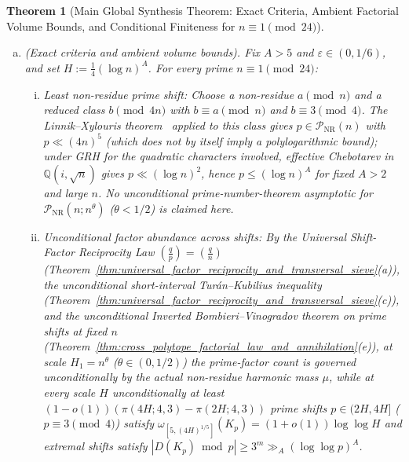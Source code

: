 \documentclass[11pt, a4paper]{article}
\theoremstyle{plain}
\newtheorem{theorem}{Theorem}[section]
\theoremstyle{definition}
\newcommand{\Q}{\mathbb{Q}}
\newcommand{\leg}[2]{\left(\frac{#1}{#2}\right)}
\begin{document}
\begin{theorem}[Main Global Synthesis Theorem: Exact Criteria, Ambient Factorial Volume Bounds, and Conditional Finiteness for $n\equiv1\pmod{24}$]
\begin{enumerate}[(a)]
    \item \emph{(Exact criteria and ambient volume bounds).} Fix $A>5$ and $\varepsilon\in(0,1/6)$, and set $H:=\frac14(\log n)^{A}$. For every prime $n\equiv1\pmod{24}$:
    \begin{enumerate}[(i)]
        \item \emph{Least non-residue prime shift:} Choose a non-residue $a\pmod n$ and a reduced class $b\pmod{4n}$ with $b\equiv a\pmod n$ and $b\equiv3\pmod 4$. The Linnik--Xylouris theorem~\cite{xylouris2011} applied to this class gives $p\in\mathcal{P}_{\mathrm{NR}}(n)$ with $p\ll(4n)^{5}$ (which does not by itself imply a polylogarithmic bound); under GRH for the quadratic characters involved, effective Chebotarev in $\Q(i,\sqrt{n})$ gives $p\ll(\log n)^{2}$, hence $p\le(\log n)^{A}$ for fixed $A>2$ and large $n$. No unconditional prime-number-theorem asymptotic for $\mathcal{P}_{\mathrm{NR}}(n;n^{\theta})$ ($\theta<1/2$) is claimed here.

        \item \emph{Unconditional factor abundance across shifts:} By the Universal Shift-Factor Reciprocity Law $\leg{q}{p}=\leg{q}{n}$ (Theorem~\ref{thm:universal_factor_reciprocity_and_transversal_sieve}(a)), the unconditional short-interval Tur\'{a}n--Kubilius inequality (Theorem~\ref{thm:universal_factor_reciprocity_and_transversal_sieve}(c)), and the unconditional Inverted Bombieri--Vinogradov theorem on prime shifts at fixed $n$ (Theorem~\ref{thm:cross_polytope_factorial_law_and_annihilation}(e)), at scale $H_1=n^{\theta}$ ($\theta\in(0,1/2)$) the prime-factor count is governed unconditionally by the actual non-residue harmonic mass $\mu$, while at \emph{every} scale $H$ unconditionally at least $(1-o(1))(\pi(4H;4,3)-\pi(2H;4,3))$ prime shifts $p\in(2H,4H]$ ($p\equiv3\pmod 4$) satisfy $\omega_{[5,(4H)^{1/5}]}(K_p)=(1+o(1))\log\log H$ and extremal shifts satisfy $|D(K_p)\bmod p|\ge 3^{m}\gg_A(\log\log p)^{A}$.


\end{enumerate}
\end{enumerate}
\end{theorem}
\end{document}
